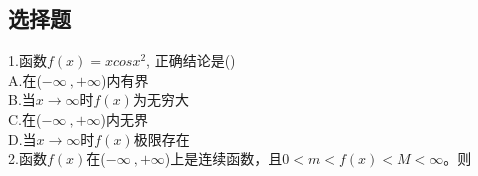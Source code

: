 

\subsection{选择题}
1.函数$f(x)=xcosx^2$, 正确结论是()\\
A.在($-\infty~,+\infty$)内有界\\
B.当$x\to\infty$时$f(x)$为无穷大\\
C.在($-\infty~,+\infty$)内无界\\
D.当$x\to\infty$时$f(x)$极限存在\\

2.函数$f(x)$在($-\infty~,+\infty$)上是连续函数，且$0<m<f(x)<M<\infty$。则